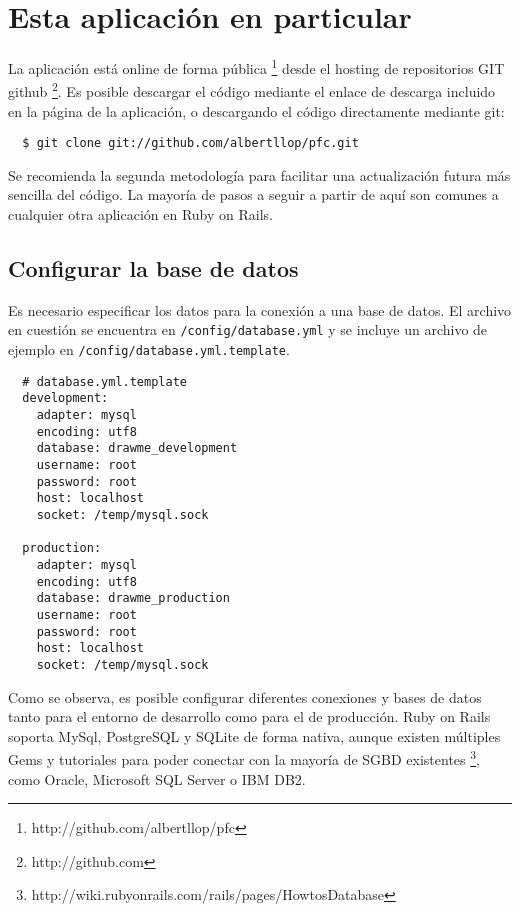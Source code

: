 \section{Esta aplicación en particular} %
\label{sec:esta_aplicacion_en_particular}

La aplicación está online de forma pública \footnote{http://github.com/albertllop/pfc} desde el hosting de repositorios GIT github \footnote{http://github.com}. Es posible descargar el código mediante el enlace de descarga incluido en la página de la aplicación, o descargando el código directamente mediante git:

\begin{verbatim}
  $ git clone git://github.com/albertllop/pfc.git
\end{verbatim}

Se recomienda la segunda metodología para facilitar una actualización futura más sencilla del código. La mayoría de pasos a seguir a partir de aquí son comunes a cualquier otra aplicación en Ruby on Rails.

\subsection{Configurar la base de datos} %
\label{sub:configurar_la_base_de_datos}

Es necesario especificar los datos para la conexión a una base de datos. El archivo en cuestión se encuentra en \texttt{/config/database.yml} y se incluye un archivo de ejemplo en \texttt{/config/database.yml.template}.

\begin{verbatim}
  # database.yml.template
  development:
    adapter: mysql
    encoding: utf8
    database: drawme_development
    username: root
    password: root
    host: localhost
    socket: /temp/mysql.sock

  production:
    adapter: mysql
    encoding: utf8
    database: drawme_production
    username: root
    password: root
    host: localhost
    socket: /temp/mysql.sock
\end{verbatim}

Como se observa, es posible configurar diferentes conexiones y bases de datos tanto para el entorno de desarrollo como para el de producción. Ruby on Rails soporta MySql, PostgreSQL y SQLite de forma nativa, aunque existen múltiples Gems y tutoriales para poder conectar con la mayoría de SGBD existentes \footnote{http://wiki.rubyonrails.com/rails/pages/HowtosDatabase}, como Oracle, Microsoft SQL Server o IBM DB2.

